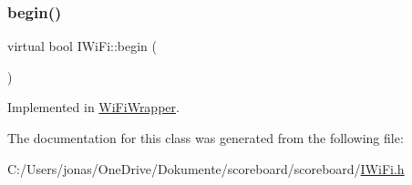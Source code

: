 \subsubsection{\texorpdfstring{begin()}{begin()}}
{\footnotesize\ttfamily virtual bool I\+Wi\+Fi\+::begin (\begin{DoxyParamCaption}{ }\end{DoxyParamCaption})\hspace{0.3cm}{\ttfamily [pure virtual]}}



Implemented in \hyperlink{class_wi_fi_wrapper_a6d2ace1968e0f9b04f690e66679dae0c}{Wi\+Fi\+Wrapper}.



The documentation for this class was generated from the following file\+:\begin{DoxyCompactItemize}
\item 
C\+:/\+Users/jonas/\+One\+Drive/\+Dokumente/scoreboard/scoreboard/\hyperlink{_i_wi_fi_8h}{I\+Wi\+Fi.\+h}\end{DoxyCompactItemize}
